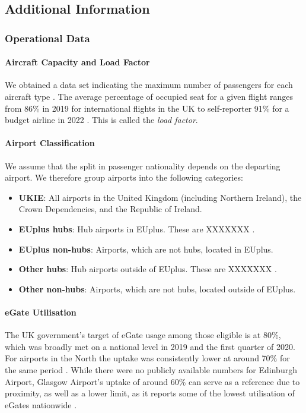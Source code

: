 \documentclass[10pt]{article}
\begin{document}
\subsection{Additional Information}


\subsubsection{Operational Data}

\paragraph{Aircraft Capacity and Load Factor}
We obtained a data set indicating the maximum number of passengers for each aircraft type \cite{aircraft_capacity}. The average percentage of occupied seat for a given flight ranges from 86\% in 2019 for international flights in the UK \cite{loading_factor_national} to self-reporter 91\% for a budget airline in 2022 \cite{loading_factor_ryanair}. This is called the \textit{load factor}.

\paragraph{Airport Classification}
We assume that the split in passenger nationality depends on the departing airport. We therefore group airports into the following categories: 
\begin{itemize}
    \item \textbf{UKIE}: All airports in the United Kingdom (including Northern Ireland), the Crown Dependencies, and the Republic of Ireland.
    \item \textbf{EUplus hubs}: Hub airports in EUplus. These are XXXXXXX \cite{mega_hubs}.
    \item \textbf{EUplus non-hubs}: Airports, which are not hubs, located in EUplus.
    \item \textbf{Other hubs}: Hub airports outside of EUplus. These are XXXXXXX \cite{mega_hubs}.
    \item \textbf{Other non-hubs}: Airports, which are not hubs, located outside of EUplus.
\end{itemize}

\paragraph{eGate Utilisation}
The UK government's target of eGate usage among those eligible is at 80\%, which was broadly met on a national level in 2019 and the first quarter of 2020. For airports in the North the uptake was consistently lower at around 70\% for the same period \cite{Inspection_eGates}. While there were no publicly available numbers for Edinburgh Airport, Glasgow Airport's uptake of around 60\% can serve as a reference due to proximity, as well as a lower limit, as it reports some of the lowest utilisation of eGates nationwide \cite{Inspection_eGates}. 
\end{document}
